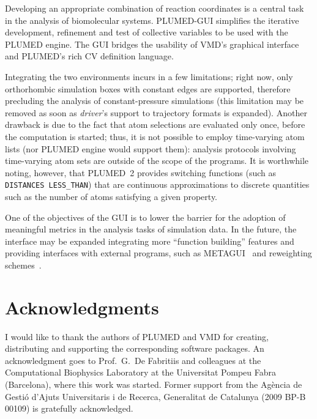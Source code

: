 \documentclass[preprint,review,11pt]{elsarticle}
\begin{document}
Developing an appropriate combination of reaction coordinates is a
central task in the analysis of biomolecular systems.  PLUMED-GUI
simplifies the iterative development, refinement and test of
collective variables to be used with the PLUMED engine.  The GUI
bridges the usability of VMD's graphical interface and PLUMED's rich
CV definition language.  

Integrating the two environments incurs in a few limitations; right
now, only orthorhombic simulation boxes with constant edges are
supported, therefore precluding the analysis of constant-pressure
simulations (this limitation may be removed as soon as \emph{driver}'s
support to trajectory formats is expanded). Another drawback is due to
the fact that atom selections are evaluated only once, before the
computation is started; thus, it is not possible to employ
time-varying atom lists (nor PLUMED engine would support them):
analysis protocols involving time-varying atom sets are outside of the
scope of the programs. It is worthwhile noting, however, that PLUMED~2
provides switching functions (such as \texttt{DISTANCES LESS\_THAN})
that are continuous approximations to discrete quantities
such as the number of atoms satisfying a given property.

One of the objectives of the GUI is to lower the barrier for the
adoption of meaningful metrics in the analysis tasks of simulation
data. In the future, the interface may be expanded integrating more
``function building'' features and providing interfaces with external
programs, such as METAGUI~\cite{Biarnes_Pietrucci_Marinelli_Laio_2012}
and reweighting schemes~\cite{Bonomi_Barducci_Parrinello_2009}.





\section{Acknowledgments}

I would like to thank the authors of PLUMED and VMD for creating,
distributing and supporting the corresponding software packages. An
acknowledgment goes to Prof.\ G.\ De Fabritiis and colleagues at the
Computational Biophysics Laboratory at the Universitat Pompeu Fabra
(Barcelona), where this work was started. Former support from the
Ag\`encia de Gesti\'o d'Ajuts Universitaris i de Recerca, Generalitat
de Catalunya (2009 BP-B 00109) is gratefully acknowledged.
\end{document}
